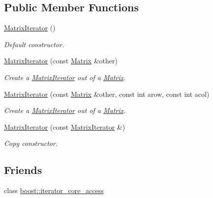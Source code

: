 \subsection*{Public Member Functions}
\begin{DoxyCompactItemize}
\item 
\hyperlink{class_matrix_iterator_af6e88a1b0212e5dae1b9653f2656d998}{MatrixIterator} ()
\begin{DoxyCompactList}\small\item\em Default constructor. \item\end{DoxyCompactList}\item 
\hyperlink{class_matrix_iterator_a662eef6bd5137162f18cb910a1c7bf40}{MatrixIterator} (const \hyperlink{class_matrix}{Matrix} \&other)
\begin{DoxyCompactList}\small\item\em Create a \hyperlink{class_matrix_iterator}{MatrixIterator} out of a \hyperlink{class_matrix}{Matrix}. \item\end{DoxyCompactList}\item 
\hyperlink{class_matrix_iterator_afb1bb1d080d0a59fe88a1d875a4bca5d}{MatrixIterator} (const \hyperlink{class_matrix}{Matrix} \&other, const int arow, const int acol)
\begin{DoxyCompactList}\small\item\em Create a \hyperlink{class_matrix_iterator}{MatrixIterator} out of a \hyperlink{class_matrix}{Matrix}. \item\end{DoxyCompactList}\item 
\hyperlink{class_matrix_iterator_ad76738f7e6933d090a2fe9632e02441c}{MatrixIterator} (const \hyperlink{class_matrix_iterator}{MatrixIterator} \&)
\begin{DoxyCompactList}\small\item\em Copy constructor. \item\end{DoxyCompactList}\end{DoxyCompactItemize}
\subsection*{Friends}
\begin{DoxyCompactItemize}
\item 
class \hyperlink{class_matrix_iterator_ac09f73e325921cc50ebcd96bed0f8096}{boost::iterator\_\-core\_\-access}
\end{DoxyCompactItemize}



